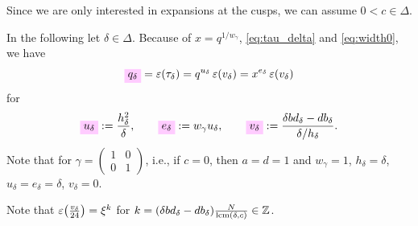 \documentclass{article}
\begin{document}
Since we are only interested in expansions at the cusps, we can assume
$0<c\in\Delta$.

In the following let $\delta \in \Delta$. Because of
$x=q^{1/w_\gamma}$, \eqref{eq:tau_delta} and \eqref{eq:width0}, we
have
\begin{gather}
  \defineNotation[q-delta]{q_\delta} = \unityPower{\tau_\delta}
  = q^{u_\delta} \, \unityPower{v_\delta}
  = x^{e_\delta} \, \unityPower{v_\delta}
\label{eq:q_delta}
\end{gather}
for
\begin{gather}
  \defineNotation[u-delta]{u_\delta} :=
  \frac{h_\delta^2}{\delta},
  \qquad
  \defineNotation[e-delta]{e_\delta} :=
  w_\gamma u_\delta,
  \qquad
  \defineNotation[v-delta]{v_\delta} :=
  \frac{\delta b d_\delta-d b_\delta}{\delta/h_\delta}.
  \label{eq:uv_delta}
\end{gather}
Note that for
$\gamma=\left(\begin{smallmatrix}1&0\\0&1\end{smallmatrix}\right)$,
i.e., if $c=0$, then $a=d=1$ and
$w_\gamma=1$,
$h_\delta=\delta$, $u_\delta=e_\delta=\delta$, $v_\delta=0$.

%
Note that $\varepsilon\!\left(\frac{v_\delta}{24}\right) = \xi^k$ for
$k = (\delta b d_\delta - d b_\delta) \frac{N}{\operatorname{lcm}(\delta,c)}\in \mathbb{Z}$.
\end{document}
